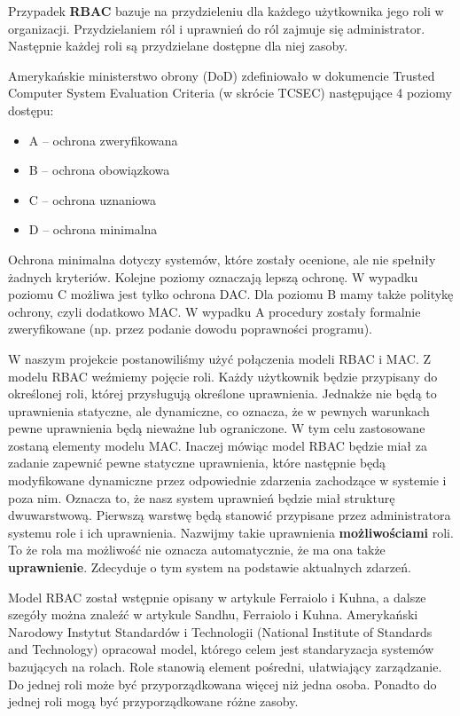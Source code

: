 \documentclass{classrep}
\begin{document}
Przypadek \textbf{RBAC} bazuje na przydzieleniu dla każdego użytkownika jego roli w organizacji. Przydzielaniem ról i uprawnień do ról zajmuje się administrator. Następnie każdej roli
są przydzielane dostępne dla niej zasoby.

Amerykańskie ministerstwo obrony (DoD) zdefiniowało w dokumencie Trusted Computer System Evaluation Criteria\cite{TCSEC} (w skrócie TCSEC) następujące 4 poziomy dostępu:
\begin{itemize}
\item A -- ochrona zweryfikowana
\item B -- ochrona obowiązkowa
\item C -- ochrona uznaniowa
\item D -- ochrona minimalna
\end{itemize}

Ochrona minimalna dotyczy systemów, które zostały ocenione, ale nie spełniły żadnych kryteriów. Kolejne poziomy oznaczają lepszą ochronę. W wypadku poziomu C możliwa jest
tylko ochrona DAC. Dla poziomu B mamy także politykę ochrony, czyli dodatkowo MAC. W wypadku A procedury zostały formalnie zweryfikowane (np. przez podanie dowodu poprawności programu).

W naszym projekcie postanowiliśmy użyć połączenia modeli RBAC i MAC. Z modelu RBAC weźmiemy pojęcie roli. Każdy użytkownik będzie przypisany do określonej roli, której przysługują
określone uprawnienia. Jednakże nie będą to uprawnienia statyczne, ale dynamiczne, co oznacza, że w pewnych warunkach pewne uprawnienia będą nieważne lub ograniczone.
W tym celu zastosowane zostaną elementy modelu MAC. Inaczej mówiąc model RBAC będzie miał za zadanie zapewnić pewne statyczne uprawnienia, które następnie będą modyfikowane dynamiczne
przez odpowiednie zdarzenia zachodzące w systemie i poza nim. Oznacza to, że nasz system uprawnień będzie miał strukturę dwuwarstwową. Pierwszą warstwę będą stanowić
przypisane przez administratora systemu role i ich uprawnienia. Nazwijmy takie uprawnienia \textbf{możliwościami} roli. To że rola ma możliwość nie oznacza automatycznie,
że ma ona także \textbf{uprawnienie}. Zdecyduje o tym system na podstawie aktualnych zdarzeń.

Model RBAC został wstępnie opisany w artykule Ferraiolo i Kuhna\cite{RBAC}, a dalsze szegóły można znaleźć w artykule Sandhu, Ferraiolo i Kuhna\cite{NISTModel}.
Amerykański Narodowy Instytut Standardów i Technologii (National Institute of Standards and Technology) opracował model\cite{NIST}, którego celem jest standaryzacja systemów
bazujących na rolach. Role stanowią element pośredni, ułatwiający zarządzanie. Do jednej roli może być przyporządkowana więcej niż jedna osoba. Ponadto do jednej roli mogą być
przyporządkowane różne zasoby.
\end{document}
